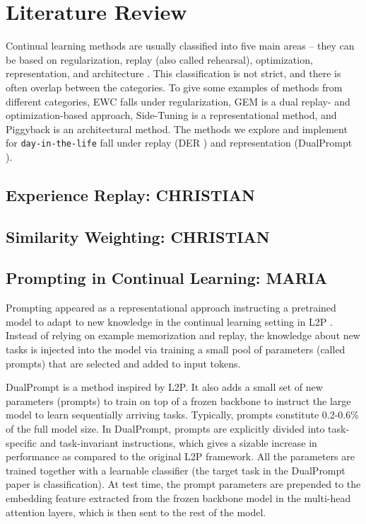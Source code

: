 \documentclass{article}
\begin{document}
\section{Literature Review}
Continual learning methods are usually classified into five main areas -- they can be based on
regularization, replay (also called rehearsal), optimization, representation, and architecture
\cite{cl-overview}. This classification is not strict, and there is often overlap between the categories. To
give some examples of methods from different categories, EWC \cite{ewc} falls under regularization, GEM
\cite{gem} is a dual replay- and optimization-based approach, Side-Tuning \cite{side-tuning} is a
representational method, and Piggyback \cite{piggyback} is an architectural method. The methods we explore
and implement for \texttt{day-in-the-life} fall under replay (DER \cite{der}) and representation (DualPrompt
\cite{dualprompt}).

\subsection{Experience Replay: CHRISTIAN}

\subsection{Similarity Weighting: CHRISTIAN}

\subsection{Prompting in Continual Learning: MARIA}
Prompting appeared as a representational approach instructing a pretrained model to adapt to new knowledge in
the continual learning setting in L2P \cite{l2p}. Instead of relying on example memorization and replay, the
knowledge about new tasks is injected into the model via training a small pool of parameters (called prompts)
that are selected and added to input tokens.

DualPrompt \cite{dualprompt} is a method inspired by L2P. It also adds a small set of new parameters
(prompts) to train on top of a frozen backbone to instruct the large model to learn sequentially arriving
tasks. Typically, prompts constitute 0.2-0.6\% of the full model size. In DualPrompt, prompts are explicitly
divided into task-specific and task-invariant instructions, which gives a sizable increase in performance as
compared to the original L2P framework. All the parameters are trained together with a learnable classifier
(the target task in the DualPrompt paper is classification). At test time, the prompt parameters are
prepended to the embedding feature extracted from the frozen backbone model in the multi-head attention
layers, which is then sent to the rest of the model.
\end{document}

